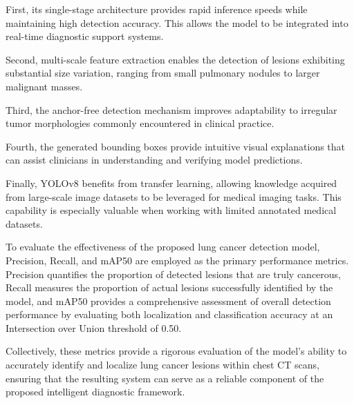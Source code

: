 First, its single-stage architecture provides rapid inference speeds while maintaining high detection accuracy. This allows the model to be integrated into real-time diagnostic support systems.

Second, multi-scale feature extraction enables the detection of lesions exhibiting substantial size variation, ranging from small pulmonary nodules to larger malignant masses.

Third, the anchor-free detection mechanism improves adaptability to irregular tumor morphologies commonly encountered in clinical practice.

Fourth, the generated bounding boxes provide intuitive visual explanations that can assist clinicians in understanding and verifying model predictions.

Finally, YOLOv8 benefits from transfer learning, allowing knowledge acquired from large-scale image datasets to be leveraged for medical imaging tasks. This capability is especially valuable when working with limited annotated medical datasets.

To evaluate the effectiveness of the proposed lung cancer detection model, Precision, Recall, and mAP50 are employed as the primary performance metrics. Precision quantifies the proportion of detected lesions that are truly cancerous, Recall measures the proportion of actual lesions successfully identified by the model, and mAP50 provides a comprehensive assessment of overall detection performance by evaluating both localization and classification accuracy at an Intersection over Union threshold of 0.50.

Collectively, these metrics provide a rigorous evaluation of the model's ability to accurately identify and localize lung cancer lesions within chest CT scans, ensuring that the resulting system can serve as a reliable component of the proposed intelligent diagnostic framework.